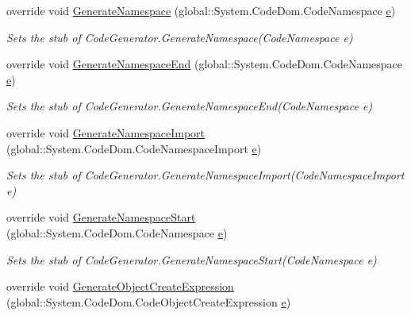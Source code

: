 \begin{DoxyCompactItemize}
override void \hyperlink{class_system_1_1_code_dom_1_1_compiler_1_1_fakes_1_1_stub_code_generator_af45881f171f61ac3c6f7100883d8a8ee}{Generate\-Namespace} (global\-::\-System.\-Code\-Dom.\-Code\-Namespace \hyperlink{jquery-1_810_82_8min_8js_a2c038346d47955cbe2cb91e338edd7e1}{e})
\begin{DoxyCompactList}\small\item\em Sets the stub of Code\-Generator.\-Generate\-Namespace(\-Code\-Namespace e)\end{DoxyCompactList}\item 
override void \hyperlink{class_system_1_1_code_dom_1_1_compiler_1_1_fakes_1_1_stub_code_generator_a01db7758cfb6785b1355885feddfa8e4}{Generate\-Namespace\-End} (global\-::\-System.\-Code\-Dom.\-Code\-Namespace \hyperlink{jquery-1_810_82_8min_8js_a2c038346d47955cbe2cb91e338edd7e1}{e})
\begin{DoxyCompactList}\small\item\em Sets the stub of Code\-Generator.\-Generate\-Namespace\-End(\-Code\-Namespace e)\end{DoxyCompactList}\item 
override void \hyperlink{class_system_1_1_code_dom_1_1_compiler_1_1_fakes_1_1_stub_code_generator_a17be3dd80b3f06a818dceee91a8678b0}{Generate\-Namespace\-Import} (global\-::\-System.\-Code\-Dom.\-Code\-Namespace\-Import \hyperlink{jquery-1_810_82_8min_8js_a2c038346d47955cbe2cb91e338edd7e1}{e})
\begin{DoxyCompactList}\small\item\em Sets the stub of Code\-Generator.\-Generate\-Namespace\-Import(\-Code\-Namespace\-Import e)\end{DoxyCompactList}\item 
override void \hyperlink{class_system_1_1_code_dom_1_1_compiler_1_1_fakes_1_1_stub_code_generator_a314a78267805ffaffac0687e4f29838d}{Generate\-Namespace\-Start} (global\-::\-System.\-Code\-Dom.\-Code\-Namespace \hyperlink{jquery-1_810_82_8min_8js_a2c038346d47955cbe2cb91e338edd7e1}{e})
\begin{DoxyCompactList}\small\item\em Sets the stub of Code\-Generator.\-Generate\-Namespace\-Start(\-Code\-Namespace e)\end{DoxyCompactList}\item 
override void \hyperlink{class_system_1_1_code_dom_1_1_compiler_1_1_fakes_1_1_stub_code_generator_a1e78c6a77adef4f79abffa0a3b25ea3c}{Generate\-Object\-Create\-Expression} (global\-::\-System.\-Code\-Dom.\-Code\-Object\-Create\-Expression \hyperlink{jquery-1_810_82_8min_8js_a2c038346d47955cbe2cb91e338edd7e1}{e})

\end{DoxyCompactItemize}
